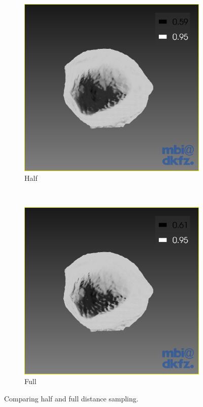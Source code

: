 \begin{figure}[H]
  \centering
  \begin{subfigure}[b]{0.5\textwidth}
    \includegraphics[width=\textwidth]{images/surface/surface_half.png}
    \caption{Half}
    \label{fig:surfacehalf}
  \end{subfigure}%
  ~ %
  \begin{subfigure}[b]{0.5\textwidth}
    \includegraphics[width=\textwidth]{images/surface/surface_full.png}
    \caption{Full}
    \label{fig:surfacefull}
  \end{subfigure}
  \caption{Comparing half and full distance sampling.}\label{fig:surfacesampledistance}
\end{figure}

